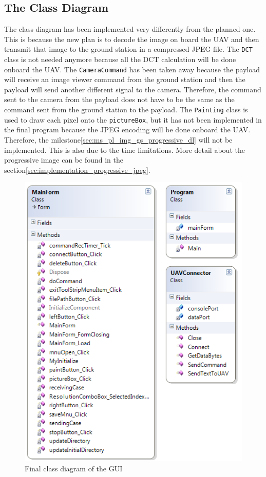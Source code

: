 \subsection*{The Class Diagram}
The class diagram has been implemented very differently from the planned one.
This is because the new plan is to decode the image on board the UAV and then transmit that image to the ground station in a compressed JPEG file. 
The \texttt{DCT} class is not needed anymore because all the DCT calculation will be done onboard the UAV. 
The \texttt{CameraCommand} has been taken away because the payload will receive an image viewer command from the ground station and then the payload will send another different signal to the camera.
Therefore, the command sent to the camera from the payload does not have to be the same as the command sent from the ground station to the payload. 
The \texttt{Painting} class is used to draw each pixel onto the \texttt{pictureBox}, but it has not been implemented in the final program because the JPEG encoding will be done onboard the UAV.
Therefore, the milestone\ref{sec:ms_pl_img_gs_progressive_dl} will not be implemented.
This is also due to the time limitations.
More detail about the progressive image can be found in the section\ref{sec:implementation_progressive_jpeg}.
 
\begin{figure}[!hbtp]
\begin{center}
\includegraphics[scale=0.7]{figures/finalClassDiagram.png} 
\end{center}
\caption{Final class diagram of the GUI\label{GUI_finalClassDiagram}}
\end{figure}


